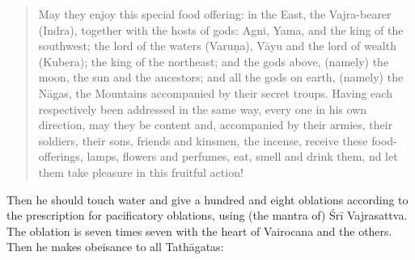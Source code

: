 \documentclass[11pt]{book}
\begin{document}
\begin{verse}
	May they enjoy this special food offering: in the East, the Vajra-bearer (Indra), together with the hosts of gods: Agni, Yama, and the king of the southwest; the lord of the waters (Varuṇa), Vāyu and the lord of wealth (Kubera); the king of the northeast; and the gods above, (namely) the moon, the sun and the ancestors; and all the gods on earth, (namely) the Nāgas, the Mountains accompanied by their secret troups. Having each respectively been addressed in the same way, every one in his own direction, may they be content and, accompanied by their armies, their soldiers, their sons, friends and kinsmen, the incense, receive these food-offerings, lamps, flowers and perfumes, eat, smell and drink them, nd let them take pleasure in this fruitful action!
 \end{verse}

Then he should touch water and give a hundred and eight oblations according to the prescription for pacificatory oblations, using (the mantra of) Śrī Vajrasattva. The oblation is seven times seven with the heart of Vairocana and the others. Then he makes obeisance to all Tathāgatas:
\end{document}
